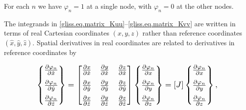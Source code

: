 \noindent
For each $n$ we have $\varphi_n = 1$ at a single node, with $\varphi_n = 0$ at the other nodes.

The integrands in \eqref{gliss.eq.matrix_Kuu}--\eqref{gliss.eq.matrix_Kvv} 
are written in terms of real Cartesian coordinates $(x,y,z)$ rather than reference coordinates
$(\hat{x},\hat{y},\hat{z})$.
Spatial derivatives in real coordinates are related to derivatives in reference coordinates by

\begin{equation}
  \label{gliss.eq.real_to_reference}
  \scalebox{1.2}{
    $
  \left\{ \begin{matrix}
    \frac{\partial {{\varphi }_{n}}}{\partial \hat{x}}  \\[6pt]
    \frac{\partial {{\varphi }_{n}}}{\partial \hat{y}}  \\[6pt]
    \frac{\partial {{\varphi }_{n}}}{\partial \hat{z}}  \\
  \end{matrix} \right\} = 
  \left[ \begin{matrix}
      \frac{\partial x}{\partial \hat{x}} & \frac{\partial y}{\partial \hat{x}} & \frac{\partial z}{\partial \hat{x}}  \\[6pt]
      \frac{\partial x}{\partial \hat{y}} & \frac{\partial y}{\partial \hat{y}} & \frac{\partial z}{\partial \hat{y}}  \\[6pt]
      \frac{\partial x}{\partial \hat{z}} & \frac{\partial y}{\partial \hat{z}} & \frac{\partial z}{\partial \hat{z}}  \\
    \end{matrix} \right]
  \left\{ \begin{matrix}
    \frac{\partial {{\varphi }_{n}}}{\partial x}  \\[6pt]
    \frac{\partial {{\varphi }_{n}}}{\partial y}  \\[6pt]
    \frac{\partial {{\varphi }_{n}}}{\partial z}  \\
  \end{matrix} \right\} =
   [J]\left\{ \begin{matrix}
     \frac{\partial {{\varphi }_{n}}}{\partial x}  \\[6pt]
     \frac{\partial {{\varphi }_{n}}}{\partial y}  \\[6pt]
     \frac{\partial {{\varphi }_{n}}}{\partial z}  \\
   \end{matrix} \right\},
   $
  }
\end{equation}


